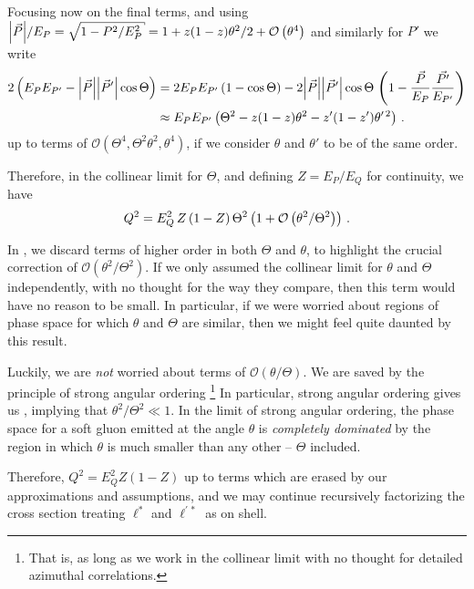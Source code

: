 \begin{example}
    Focusing now on the final terms, and using \(\abs{\vec{P}} / E_P = \sqrt{1 - P^2 / E_P^2} = 1 + z(1-z)\theta^2/2 + \mathcal{O}\le(\theta^4\ri)\) and similarly for \(P'\) we write
    \begin{align}
        2 \left(
            E_P E_{P'}
            -
            \abs{\vec{P}}\abs{\vec{P}'}\cos\Theta
        \right)
        &=
        2 E_P E_{P'}\left(1 - \cos\Theta\right)
        -
        2\abs{\vec{P}}\abs{\vec{P}'}
        \cos\Theta
        \,
        \left(1 - \frac{\vec{P}}{E_P} \frac{\vec{P'}}{E_{P'}}\right)
        \\
        &\approx
        E_P E_{P'} \left(
            \Theta^2
            -
            z(1-z)\theta^2
            -
            z'(1-z')\theta^{\prime\,2}
        \right)
        \,.
    \end{align}
    up to terms of \(\mathcal{O}(\Theta^4, \Theta^2 \theta^2, \theta^4)\), if we consider \(\theta\) and \(\theta'\) to be of the same order.

    Therefore, in the collinear limit for \(\Theta\), and defining \(Z = E_P / E_Q\) for continuity, we have
    \begin{align}
        \label{eq:mass-strong-ordering}
        Q^2
        =
        E_Q^2
        \,
        Z \le(1-Z\ri) \Theta^2
        \le(
            1 + \mathcal{O}\le(\theta^2/\Theta^2\ri)
        \ri)
        \,.
    \end{align}

    In , we discard terms of higher order in both \(\Theta\) and \(\theta\), to highlight the crucial correction of \(\mathcal{O}(\theta^2/\Theta^2)\).
    If we only assumed the collinear limit for \(\theta\) and \(\Theta\) independently, with no thought for the way they compare, then this term would have no reason to be small.
    In particular, if we were worried about regions of phase space for which \(\theta\) and \(\Theta\) are similar, then we might feel quite daunted by this result.

    Luckily, we are \textit{not} worried about terms of \(\mathcal{O}(\theta/\Theta)\).
    We are saved by the principle of strong angular ordering%
    \footnote{
        That is, as long as we work in the collinear limit with no thought for detailed azimuthal correlations.
    }
    In particular, strong angular ordering gives us , implying that \(\theta^2 / \Theta^2 \ll 1\).
    In the limit of strong angular ordering, the phase space for a soft gluon emitted at the angle \(\theta\) is \textit{completely dominated} by the region in which \(\theta\) is much smaller than any other -- \(\Theta\) included.

    Therefore, \(Q^2 = E_Q^2 Z(1-Z)\) up to terms which are erased by our approximations and assumptions, and we may continue recursively factorizing the cross section treating \(\ell^*\) and \(\ell^{'\,*}\) as on shell.
\end{example}

